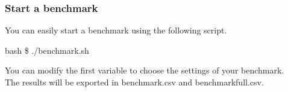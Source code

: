 \subsubsection{Start a benchmark}
You can easily start a benchmark using the following script.
\begin{resultbox}
    bash \$ ./benchmark.sh
\end{resultbox}
You can modify the first variable to choose the settings of your benchmark.\\
The results will be exported in benchmark.csv and benchmarkfull.csv.